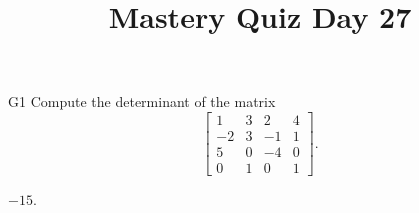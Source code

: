 \documentclass{sbgLAquiz}
\title{Mastery Quiz Day 27 }
\begin{document}
\begin{problem}{G1}
Compute the determinant of the matrix
\[
  \begin{bmatrix}
    1 & 3 & 2 & 4 \\
    -2 & 3 & -1 & 1 \\
    5 & 0 & -4 & 0 \\
    0 & 1 & 0 & 1
  \end{bmatrix}
.\]
\end{problem}
\begin{solution}
\(-15\).
\end{solution}
\end{document}
